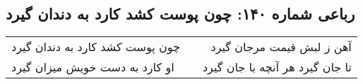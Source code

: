 \begin{center}
\section*{رباعی شماره ۱۴۰: چون پوست کشد کارد به دندان گیرد}
\label{sec:sh140}
\begin{longtable}{l p{0.5cm} r}
چون پوست کشد کارد به دندان گیرد
&&
آهن ز لبش قیمت مرجان گیرد
\\
او کارد به دست خویش میزان گیرد
&&
تا جان گیرد هر آنچه با جان گیرد
\\
\end{longtable}
\end{center}

